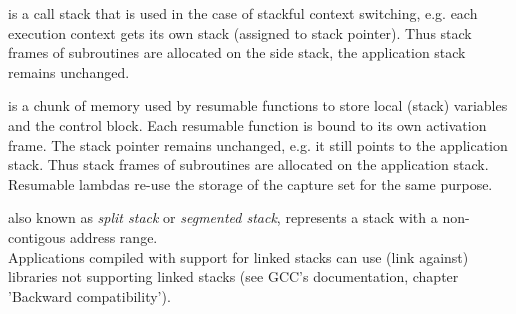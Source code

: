 is a call stack that is used in the case of stackful context switching, e.g.
each execution context gets its own stack (assigned to stack pointer). Thus
stack frames of subroutines are allocated on the side stack, the application
stack remains unchanged.

is a chunk of memory used by resumable functions to store local (stack)
variables and the control block. Each resumable function is bound to its own
activation frame. The stack pointer remains unchanged, e.g. it still points to
the application stack. Thus stack frames of subroutines are allocated on the 
application stack.\\
Resumable lambdas re-use the storage of the capture set for the same purpose.

also known as \textit{split stack}\cite{gccsplit} or
\textit{segmented stack}\cite{llvmseg}, represents a stack with a non-contigous
address range.\\
Applications compiled with support for linked stacks can use (link against)
libraries not supporting linked stacks (see GCC's documentation\cite{gccsplit},
chapter 'Backward compatibility').
